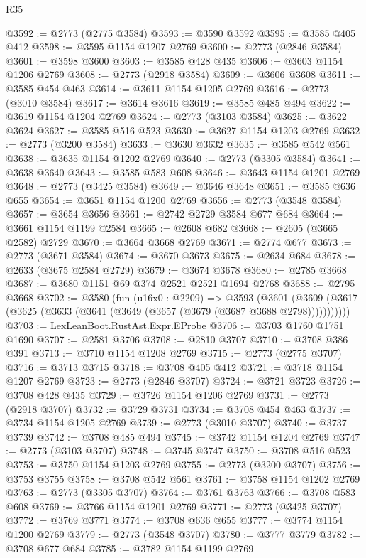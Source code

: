 \begin{lexlean}{R35}
\begin{coremodule}
@3592 := @2773 (@2775 @3584)
@3593 := @3590 @3592
@3595 := @3585 @405 @412
@3598 := @3595 @1154 @1207 @2769
@3600 := @2773 (@2846 @3584)
@3601 := @3598 @3600
@3603 := @3585 @428 @435
@3606 := @3603 @1154 @1206 @2769
@3608 := @2773 (@2918 @3584)
@3609 := @3606 @3608
@3611 := @3585 @454 @463
@3614 := @3611 @1154 @1205 @2769
@3616 := @2773 (@3010 @3584)
@3617 := @3614 @3616
@3619 := @3585 @485 @494
@3622 := @3619 @1154 @1204 @2769
@3624 := @2773 (@3103 @3584)
@3625 := @3622 @3624
@3627 := @3585 @516 @523
@3630 := @3627 @1154 @1203 @2769
@3632 := @2773 (@3200 @3584)
@3633 := @3630 @3632
@3635 := @3585 @542 @561
@3638 := @3635 @1154 @1202 @2769
@3640 := @2773 (@3305 @3584)
@3641 := @3638 @3640
@3643 := @3585 @583 @608
@3646 := @3643 @1154 @1201 @2769
@3648 := @2773 (@3425 @3584)
@3649 := @3646 @3648
@3651 := @3585 @636 @655
@3654 := @3651 @1154 @1200 @2769
@3656 := @2773 (@3548 @3584)
@3657 := @3654 @3656
@3661 := @2742 @2729 @3584 @677 @684
@3664 := @3661 @1154 @1199 @2584
@3665 := @2608 @682
@3668 := @2605 (@3665 @2582) @2729
@3670 := @3664 @3668 @2769
@3671 := @2774 @677
@3673 := @2773 (@3671 @3584)
@3674 := @3670 @3673
@3675 := @2634 @684
@3678 := @2633 (@3675 @2584 @2729)
@3679 := @3674 @3678
@3680 := @2785 @3668
@3687 := @3680 @1151 @69 @374 @2521 @2521 @1694 @2768
@3688 := @2795 @3668
@3702 := @3580
    (fun (u16x0 : @2209) =>
    @3593
      (@3601 (@3609 (@3617 (@3625 (@3633 (@3641 (@3649 (@3657 (@3679 (@3687 @3688 @2798)))))))))))
@3703 := LexLeanBoot.RustAst.Expr.EProbe
@3706 := @3703 @1760 @1751 @1690
@3707 := @2581 @3706
@3708 := @2810 @3707
@3710 := @3708 @386 @391
@3713 := @3710 @1154 @1208 @2769
@3715 := @2773 (@2775 @3707)
@3716 := @3713 @3715
@3718 := @3708 @405 @412
@3721 := @3718 @1154 @1207 @2769
@3723 := @2773 (@2846 @3707)
@3724 := @3721 @3723
@3726 := @3708 @428 @435
@3729 := @3726 @1154 @1206 @2769
@3731 := @2773 (@2918 @3707)
@3732 := @3729 @3731
@3734 := @3708 @454 @463
@3737 := @3734 @1154 @1205 @2769
@3739 := @2773 (@3010 @3707)
@3740 := @3737 @3739
@3742 := @3708 @485 @494
@3745 := @3742 @1154 @1204 @2769
@3747 := @2773 (@3103 @3707)
@3748 := @3745 @3747
@3750 := @3708 @516 @523
@3753 := @3750 @1154 @1203 @2769
@3755 := @2773 (@3200 @3707)
@3756 := @3753 @3755
@3758 := @3708 @542 @561
@3761 := @3758 @1154 @1202 @2769
@3763 := @2773 (@3305 @3707)
@3764 := @3761 @3763
@3766 := @3708 @583 @608
@3769 := @3766 @1154 @1201 @2769
@3771 := @2773 (@3425 @3707)
@3772 := @3769 @3771
@3774 := @3708 @636 @655
@3777 := @3774 @1154 @1200 @2769
@3779 := @2773 (@3548 @3707)
@3780 := @3777 @3779
@3782 := @3708 @677 @684
@3785 := @3782 @1154 @1199 @2769

\end{coremodule}
\end{lexlean}

